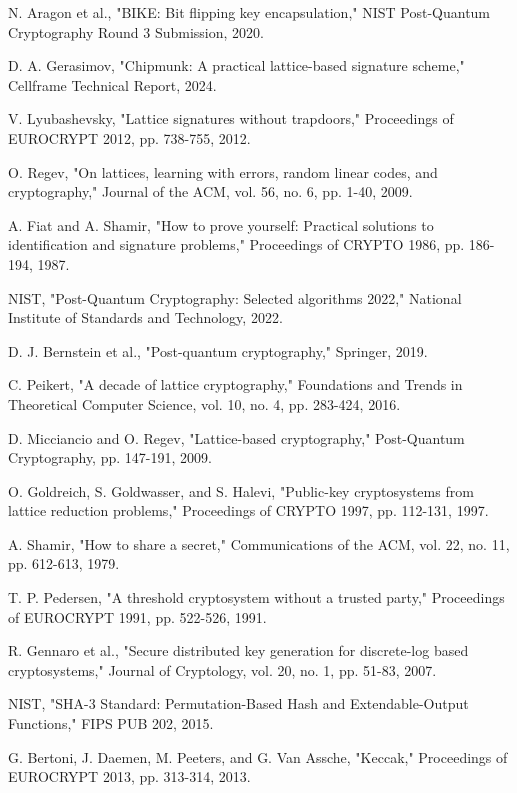 \documentclass[11pt,a4paper]{article}
\begin{document}
\begin{thebibliography}{99}
N. Aragon et al., "BIKE: Bit flipping key encapsulation," NIST Post-Quantum Cryptography Round 3 Submission, 2020.

D. A. Gerasimov, "Chipmunk: A practical lattice-based signature scheme," Cellframe Technical Report, 2024.

V. Lyubashevsky, "Lattice signatures without trapdoors," Proceedings of EUROCRYPT 2012, pp. 738-755, 2012.

O. Regev, "On lattices, learning with errors, random linear codes, and cryptography," Journal of the ACM, vol. 56, no. 6, pp. 1-40, 2009.

A. Fiat and A. Shamir, "How to prove yourself: Practical solutions to identification and signature problems," Proceedings of CRYPTO 1986, pp. 186-194, 1987.

NIST, "Post-Quantum Cryptography: Selected algorithms 2022," National Institute of Standards and Technology, 2022.

D. J. Bernstein et al., "Post-quantum cryptography," Springer, 2019.

C. Peikert, "A decade of lattice cryptography," Foundations and Trends in Theoretical Computer Science, vol. 10, no. 4, pp. 283-424, 2016.

D. Micciancio and O. Regev, "Lattice-based cryptography," Post-Quantum Cryptography, pp. 147-191, 2009.

O. Goldreich, S. Goldwasser, and S. Halevi, "Public-key cryptosystems from lattice reduction problems," Proceedings of CRYPTO 1997, pp. 112-131, 1997.

A. Shamir, "How to share a secret," Communications of the ACM, vol. 22, no. 11, pp. 612-613, 1979.

T. P. Pedersen, "A threshold cryptosystem without a trusted party," Proceedings of EUROCRYPT 1991, pp. 522-526, 1991.

R. Gennaro et al., "Secure distributed key generation for discrete-log based cryptosystems," Journal of Cryptology, vol. 20, no. 1, pp. 51-83, 2007.

NIST, "SHA-3 Standard: Permutation-Based Hash and Extendable-Output Functions," FIPS PUB 202, 2015.

G. Bertoni, J. Daemen, M. Peeters, and G. Van Assche, "Keccak," Proceedings of EUROCRYPT 2013, pp. 313-314, 2013.


\end{thebibliography}
\end{document}
